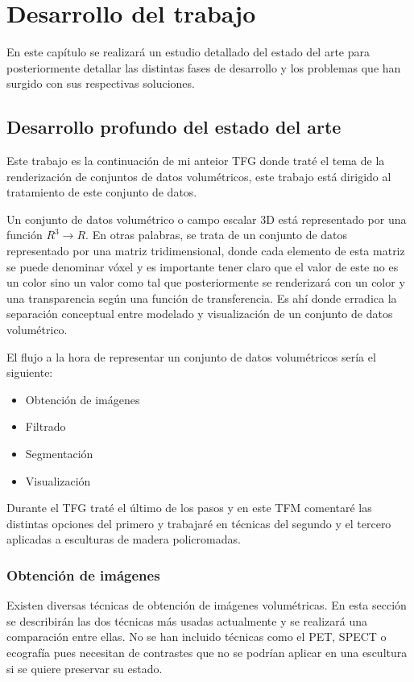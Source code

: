 \chapter{Desarrollo del trabajo}

En este capítulo se realizará un estudio detallado del estado del arte para posteriormente detallar las distintas fases de desarrollo y los problemas que han surgido con sus respectivas soluciones.

\section{Desarrollo profundo del estado del arte}

Este trabajo es la continuación de mi anteior TFG donde traté el tema de la renderización de conjuntos de datos volumétricos, este trabajo está dirigido al tratamiento de este conjunto de datos.

Un conjunto de datos volumétrico o campo escalar 3D está representado por una función $R^{3} \rightarrow R$. En otras palabras, se trata de un conjunto de datos representado por una matriz tridimensional, donde cada elemento de esta matriz se puede denominar vóxel y es importante tener claro que el valor de este no es un color sino un valor como tal que posteriormente se renderizará con un color y una transparencia según una función de transferencia. Es ahí donde erradica la separación conceptual entre modelado y visualización de un conjunto de datos volumétrico.

El flujo a la hora de representar un conjunto de datos volumétricos sería el siguiente:

\begin{itemize}
	\item Obtención de imágenes
	\item Filtrado
	\item Segmentación
	\item Visualización
\end{itemize}

Durante el TFG traté el último de los pasos y en este TFM comentaré las distintas opciones del primero y trabajaré en técnicas del segundo y el tercero aplicadas a esculturas de madera policromadas.

\subsection{Obtención de imágenes}

Existen diversas técnicas de obtención de imágenes volumétricas. En esta sección se describirán las dos técnicas más usadas actualmente y se realizará una comparación entre ellas. No se han incluido técnicas como el PET, SPECT o ecografía pues necesitan de contrastes que no se podrían aplicar en una escultura si se quiere preservar su estado.

